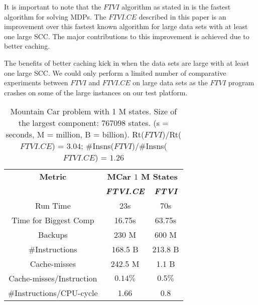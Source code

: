 \documentclass[conference]{IEEEtran}
\begin{document}
It is important to note that the $FTVI$ algorithm as stated in \cite{b10} is the fastest algorithm for solving MDPs. The $FTVI.CE$ described in this paper is an improvement over this fastest known algorithm for large data sets with at least one large SCC. The major contributions to this improvement is achieved due to better caching.

The benefits of better caching kick in when the data sets are large with at least one large SCC. We could only perform a limited number of comparative experiments between $FTVI$ and $FTVI.CE$ on large data sets as the $FTVI$ program crashes on some of the large instances on our test platform.

\label{sec:tables}
\begin{table}[h!]
\caption{Mountain Car problem with 1 M states. Size of the largest component: $767098$ states. (s = seconds, M = million, B = billion). Rt($FTVI$)/Rt($FTVI.CE$) = $3.04$;  \#Insns($FTVI$)/\#Insns($FTVI.CE$) = $1.26$}
\begin{center}
\begin{tabular}{|c|c|c|}
\hline
\textbf{Metric}&\multicolumn{2}{|c|}{\textbf{MCar $1$ M States}} \\
\cline{2-3}
\textbf{} & \textbf{\textit{FTVI.CE}}& \textbf{\textit{FTVI}} \\
\hline
Run Time & 23s & 70s \\
\hline
Time for Biggest Comp & 16.75s & 63.75s \\
\hline
Backups & 230 M & 600 M \\
\hline
\#Instructions & 168.5 B & 213.8 B \\
\hline
Cache-misses & 242.5 M & 1.1 B \\
\hline 
Cache-misses/Instruction & $0.14\%$ & $0.5\%$ \\
\hline
\#Instructions/CPU-cycle & 1.66 & 0.8 \\
\hline
\end{tabular}
\label{tab1}
\end{center}
\end{table}
\end{document}
